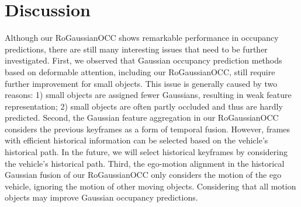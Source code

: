 \documentclass[journal]{IEEEtran}
\begin{document}
\section{Discussion}
\label{sec:discussion}

Although our RoGaussianOCC shows remarkable performance in occupancy predictions, there are still many interesting issues that need to be further investigated.
First, we observed that Gaussian occupancy prediction methods based on deformable attention, including our RoGaussianOCC, still require further improvement for small objects.
This issue is generally caused by two reasons: 1) small objects are assigned fewer Gaussians, resulting in weak feature representation; 2) small objects are often partly occluded and thus are hardly predicted.
Second, the Gaussian feature aggregation in our RoGaussianOCC considers the previous keyframes as a form of temporal fusion.
However, frames with efficient historical information can be selected based on the vehicle's historical path.
In the future, we will select historical keyframes by considering the vehicle's historical path.
Third, the ego-motion alignment in the historical Gaussian fusion of our RoGaussianOCC only considers the motion of the ego vehicle, ignoring the motion of other moving objects.
Considering that all motion objects may improve Gaussian occupancy predictions.
\end{document}
